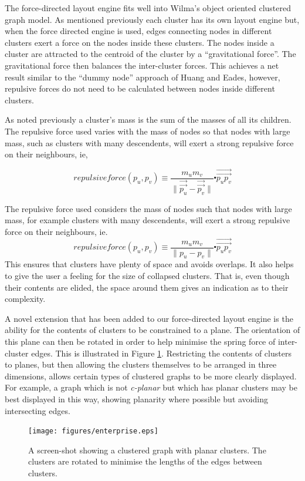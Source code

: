 \documentclass[runningheads]{cl2emult}
\newcommand{\avec}[1]{\vec{\overrightarrow{ #1}}}
\begin{document}
The force-directed layout engine fits well into Wilma's object
oriented clustered graph model.  As mentioned previously each cluster
has its own layout engine but, when the force directed engine is used,
edges connecting nodes in different clusters exert a force on
the nodes inside these clusters.  The nodes inside a cluster are
attracted to the centroid of the cluster by a ``gravitational force''.
The gravitational force then balances the inter-cluster forces.  This
achieves a net result similar to the ``dummy node'' approach of Huang
and Eades\cite{Huang:GD98}, however, repulsive forces do not need to be
calculated between nodes inside different clusters.

As noted previously a cluster's mass is the sum of the masses of all
its children.
The repulsive force used varies with the mass of nodes so
that nodes with large mass, such as clusters with many descendents,
will exert a strong repulsive force on their neighbours, ie,

\begin{equation}
\mathit{repulsiveforce}(p_u,p_v) \equiv \frac{m_u m_v}{\|\avec{p_u}-\avec{p_v}\|}
\centerdot \avec{p_u p_v}
\end{equation}

The repulsive force used considers the mass of nodes such
that nodes with large mass, for example clusters with many descendents,
will exert a strong repulsive force on their neighbours, ie.\ 
\[ \mathit{repulsiveforce}(p_u,p_v) \equiv \frac{m_u m_v}{\|p_u-p_v\|}
\centerdot \avec{p_u p_v} \]
This ensures
that clusters have plenty of space and avoids overlaps.  It also helps
to give the user a feeling for the size of collapsed clusters.  That is, even
though their contents are elided, the space around them gives an
indication as to their complexity.

A novel extension that has been added to our force-directed layout
engine is the ability for the contents of clusters to be constrained
to a plane.  The orientation of this plane can then be rotated in
order to help minimise the spring force of inter-cluster edges.  This
is illustrated in Figure \ref{fig-spincluster}.  Restricting the
contents of clusters to planes, but then allowing the clusters
themselves to be arranged in three dimensions, allows certain types of
clustered
graphs to be more clearly displayed.  For example, a graph which is not
{\em c-planar}\cite{Eades:GD96} but which has planar clusters may be best
displayed in this way, showing planarity where possible but avoiding
intersecting edges.
\begin{figure}[h]
  \centering
    \texttt{[image: figures/enterprise.eps]}
  \caption{A screen-shot showing a clustered graph with planar
  clusters.  The clusters are rotated to minimise the lengths of the
  edges between clusters.}
  \label{fig-spincluster}
\end{figure}
\end{document}
